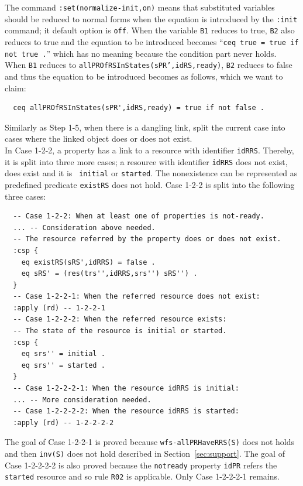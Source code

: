 \documentclass[12pt]{report}
\newcommand{\stt}[1]{{\small{\tt {#1}}}}
\begin{document}
The command \stt{:set(normalize-init,on)} means that substituted
variables should be reduced to normal forms when the equation is
introduced by the {\tt :init} command; it default option is {\tt off}.
When the variable {\tt B1} reduces to true, {\tt B2} also reduces to
true and the equation to be introduced becomes ``\stt{ceq true = true if
  not true .}''  which has no meaning because the condition part never
holds.  When {\tt B1} reduces to
\stt{allPROfRSInStates(sPR',idRS,ready)}, {\tt B2} reduces to false
and thus the equation to be introduced becomes as follows, which we
want to claim:
\small
\begin{verbatim}
  ceq allPROfRSInStates(sPR',idRS,ready) = true if not false .
\end{verbatim}
\normalsize

\vspace{0.3cm}
 Similarly as Step 1-5, when there is a
dangling link, split the current case into cases where the linked
object does or does not exist. \\
In Case 1-2-2, a property has a link to a resource with identifier
{\tt idRRS}. Thereby, it is split into three more cases; a resource
with identifier {\tt idRRS} does not exist, does exist and it is {\tt
  initial} or {\tt started}. The nonexistence can be represented as
predefined predicate {\tt existRS} does not hold. Case 1-2-2 is split
into the following three cases:
\small
\begin{verbatim}
  -- Case 1-2-2: When at least one of properties is not-ready.
  ... -- Consideration above needed.
  -- The resource referred by the property does or does not exist.
  :csp {
    eq existRS(sRS',idRRS) = false .
    eq sRS' = (res(trs'',idRRS,srs'') sRS'') .
  }
  -- Case 1-2-2-1: When the referred resource does not exist:
  :apply (rd) -- 1-2-2-1
  -- Case 1-2-2-2: When the referred resource exists:
  -- The state of the resource is initial or started.
  :csp { 
    eq srs'' = initial .
    eq srs'' = started .
  }
  -- Case 1-2-2-2-1: When the resource idRRS is initial:
  ... -- More consideration needed.
  -- Case 1-2-2-2-2: When the resource idRRS is started:
  :apply (rd) -- 1-2-2-2-2
\end{verbatim}
\normalsize
The goal of Case 1-2-2-1 is proved because \stt{wfs-allPRHaveRRS(S)}
does not holds and then \stt{inv(S)} does not hold described in
Section~\ref{sec:support}.  The goal of Case 1-2-2-2-2 is also proved
because the {\tt notready} property {\tt idPR} refers the {\tt
  started} resource and so rule {\tt R02} is applicable.  Only Case
1-2-2-2-1 remains.\\
\end{document}

